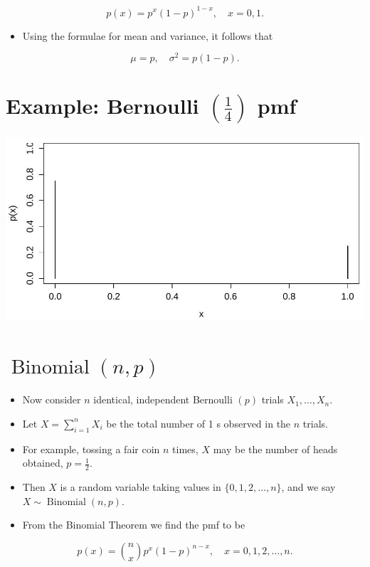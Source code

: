 \documentclass[10pt]{article}
\begin{document}
$$
p(x)=p^{x}(1-p)^{1-x}, \quad x=0,1 .
$$

\begin{itemize}
  \item Using the formulae for mean and variance, it follows that
\end{itemize}

$$
\mu=p, \quad \sigma^{2}=p(1-p) .
$$

\section*{Example: Bernoulli $(\frac{1}{4})$ pmf}
\begin{center}
\includegraphics[max width=\textwidth]{2025_05_11_35704811148ad612caa6g-27}
\end{center}

\section*{$\operatorname{Binomial}(n, p)$}
\begin{itemize}
  \item Now consider $n$ identical, independent Bernoulli $(p)$ trials $X_{1}, \ldots, X_{n}$.
  \item Let $X=\sum_{i=1}^{n} X_{i}$ be the total number of 1 s observed in the $n$ trials.
  \item For example, tossing a fair coin $n$ times, $X$ may be the number of heads obtained, $p=\frac{1}{2}$.
  \item Then $X$ is a random variable taking values in $\{0,1,2, \ldots, n\}$, and we say $X \sim \operatorname{Binomial}(n, p)$.
  \item From the Binomial Theorem we find the pmf to be
\end{itemize}

$$
p(x)=\binom{n}{x} p^{x}(1-p)^{n-x}, \quad x=0,1,2, \ldots, n .
$$
\end{document}
